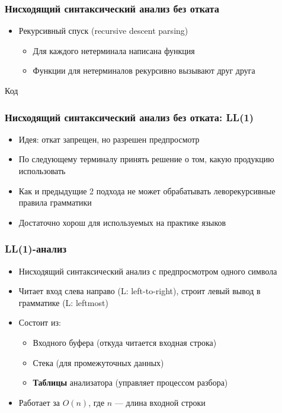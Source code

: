 \documentclass{beamer}
\begin{document}
\begin{frame}[fragile]
  \transwipe[direction=90]
  \frametitle{Нисходящий синтаксический анализ без отката}
  \begin{itemize}
    \item Рекурсивный спуск (recursive descent parsing)
    \begin{itemize}
      \item Для каждого нетерминала написана функция
      \item Функции для нетерминалов рекурсивно вызывают друг друга
    \end{itemize}
  \end{itemize}

  \bigskip

 \begin{center}
   Код
 \end{center}
\end{frame}


\begin{frame}[fragile]
  \transwipe[direction=90]
  \frametitle{Нисходящий синтаксический анализ без отката: LL(1)}
  \begin{itemize}
    \item Идея: откат запрещен, но разрешен предпросмотр
    \item По следующему терминалу принять решение о том, какую продукцию использовать
    \item Как и предыдущие 2 подхода не может обрабатывать леворекурсивные правила грамматики
    \item Достаточно хорош для используемых на практике языков
  \end{itemize}
\end{frame}


\begin{frame}[fragile]
  \transwipe[direction=90]
  \frametitle{LL(1)-анализ}
  \begin{itemize}
   \item Нисходящий синтаксический анализ с предпросмотром одного символа
   \item Читает вход слева направо (L: left-to-right), строит левый вывод в грамматике (L: leftmost)
   \item Состоит из:
   \begin{itemize}
     \item Входного буфера (откуда читается входная строка)
     \item Стека (для промежуточных данных)
     \item \textbf{Таблицы} анализатора (управляет процессом разбора)
   \end{itemize}
   \item Работает за $O(n)$, где $n$ --- длина входной строки
  \end{itemize}
\end{frame}
\end{document}
